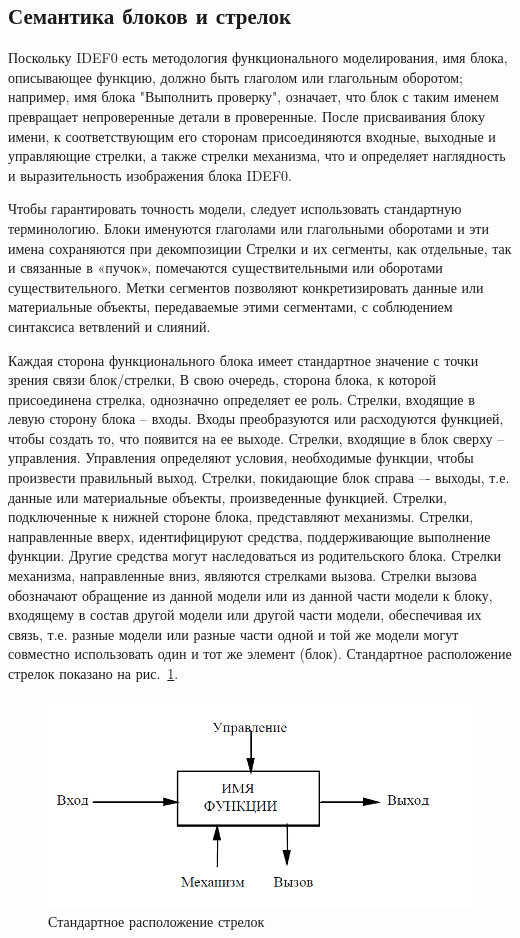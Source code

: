 \documentclass[a4paper, final]{article}
\begin{document}
\subsection{Семантика блоков и стрелок}
Поскольку IDEF0 есть методология функционального моделирования, имя блока, описывающее функцию, должно быть глаголом или глагольным оборотом; например, имя блока "Выполнить проверку", означает, что блок с таким именем превращает непроверенные детали в проверенные. После присваивания блоку имени, к соответствующим его сторонам присоединяются входные, выходные и управляющие стрелки, а также стрелки механизма, что и определяет наглядность и выразительность изображения блока IDEF0. 

Чтобы гарантировать точность модели, следует использовать стандартную
терминологию. Блоки именуются глаголами или глагольными оборотами и эти имена сохраняются при декомпозиции Стрелки и их сегменты, как отдельные, так и связанные в «пучок», помечаются существительными или оборотами существительного. Метки сегментов позволяют конкретизировать данные или материальные объекты, передаваемые этими сегментами, с соблюдением синтаксиса ветвлений и слияний.

Каждая сторона функционального блока имеет стандартное значение с точки зрения связи блок/стрелки, В свою очередь, сторона блока, к которой присоединена стрелка, однозначно определяет ее роль. Стрелки, входящие в левую сторону блока -- входы. Входы преобразуются или расходуются функцией, чтобы создать то, что появится на ее выходе. Стрелки, входящие в блок сверху -- управления. Управления определяют условия, необходимые функции, чтобы произвести правильный выход. Стрелки, покидающие блок справа –- выходы, т.е. данные или материальные объекты, произведенные функцией. Стрелки, подключенные к нижней стороне блока, представляют механизмы. Стрелки, направленные вверх, идентифицируют средства, поддерживающие выполнение функции. Другие средства могут наследоваться из родительского блока. Стрелки механизма, направленные вниз, являются стрелками вызова. Стрелки вызова обозначают обращение из данной модели или из данной части модели к блоку, входящему в состав другой модели или другой части модели, обеспечивая их связь, т.е. разные модели или разные части одной и той же модели могут совместно использовать один и тот же элемент (блок). Стандартное расположение стрелок показано на рис.~\ref{img:semantics}.

\begin{figure}[H]
   \centering
   \includegraphics[width=0.4\linewidth]{semantics.png}
   \caption{Стандартное расположение стрелок}
   \label{img:semantics}
\end{figure}
\end{document}
